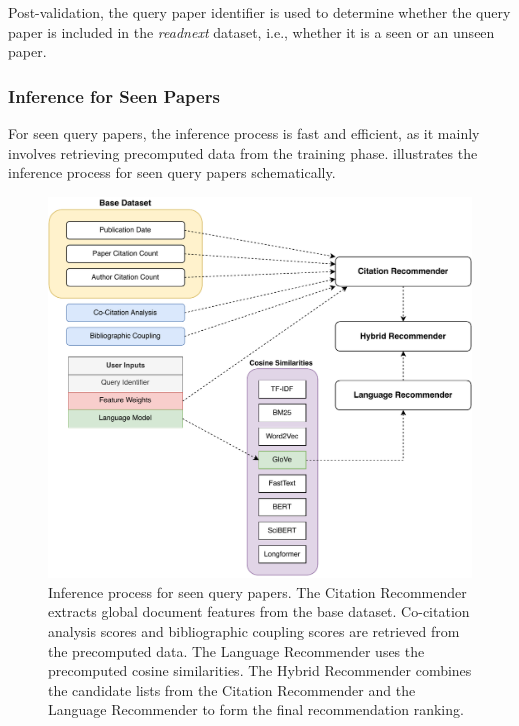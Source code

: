 Post-validation, the query paper identifier is used to determine whether the query paper is included in the \emph{readnext} dataset, i.e., whether it is a seen or an unseen paper.


\subsubsection*{Inference for Seen Papers}

For seen query papers, the inference process is fast and efficient, as it mainly involves retrieving precomputed data from the training phase.
 illustrates the inference process for seen query papers schematically.

\begin{figure}[ht!]
    \centering
    \includegraphics[width=\textwidth]{diagrams/inference_seen.pdf}
    \caption[Inference for Seen Papers]{Inference process for seen query papers.
        The Citation Recommender extracts global document features from the base dataset. Co-citation analysis scores and bibliographic coupling scores are retrieved from the precomputed data. The Language Recommender uses the precomputed cosine similarities. The Hybrid Recommender combines the candidate lists from the Citation Recommender and the Language Recommender to form the final recommendation ranking.}
    \label{fig:inference-seen}
\end{figure}

